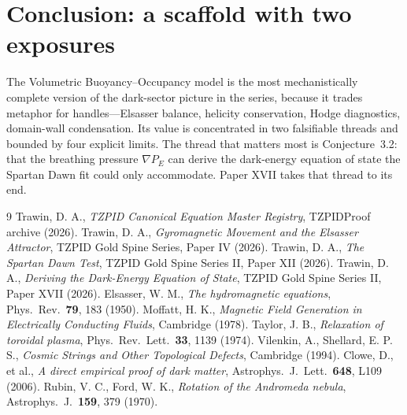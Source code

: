 \documentclass[11pt]{article}
\theoremstyle{remark}
\begin{document}
\section{Conclusion: a scaffold with two exposures}
The Volumetric Buoyancy--Occupancy model is the most mechanistically complete version of the dark-sector picture in the series, because it trades metaphor for handles---Elsasser balance, helicity conservation, Hodge diagnostics, domain-wall condensation. Its value is concentrated in two falsifiable threads and bounded by four explicit limits. The thread that matters most is Conjecture~3.2: that the breathing pressure $\nabla P_E$ can derive the dark-energy equation of state the Spartan Dawn fit could only accommodate. Paper XVII takes that thread to its end.
\begin{thebibliography}{9}
 Trawin, D. A., \emph{TZPID Canonical Equation Master Registry}, TZPIDProof archive (2026).
 Trawin, D. A., \emph{Gyromagnetic Movement and the Elsasser Attractor}, TZPID Gold Spine Series, Paper IV (2026).
 Trawin, D. A., \emph{The Spartan Dawn Test}, TZPID Gold Spine Series II, Paper XII (2026).
 Trawin, D. A., \emph{Deriving the Dark-Energy Equation of State}, TZPID Gold Spine Series II, Paper XVII (2026).
 Elsasser, W. M., \emph{The hydromagnetic equations}, Phys.\ Rev.\ \textbf{79}, 183 (1950).
 Moffatt, H. K., \emph{Magnetic Field Generation in Electrically Conducting Fluids}, Cambridge (1978).
 Taylor, J. B., \emph{Relaxation of toroidal plasma}, Phys.\ Rev.\ Lett.\ \textbf{33}, 1139 (1974).
 Vilenkin, A., Shellard, E. P. S., \emph{Cosmic Strings and Other Topological Defects}, Cambridge (1994).
 Clowe, D., et al., \emph{A direct empirical proof of dark matter}, Astrophys.\ J.\ Lett.\ \textbf{648}, L109 (2006).
 Rubin, V. C., Ford, W. K., \emph{Rotation of the Andromeda nebula}, Astrophys.\ J.\ \textbf{159}, 379 (1970).
\end{thebibliography}
\end{document}
